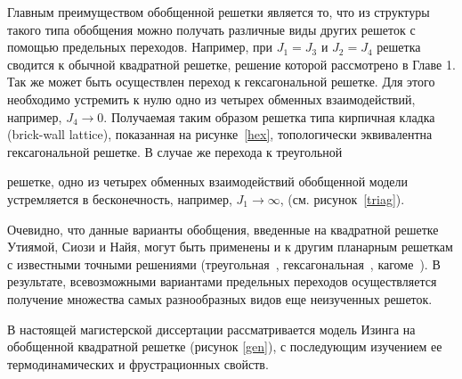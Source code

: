 Главным преимуществом обобщенной решетки является то, что из структуры такого типа обобщения можно получать различные виды других решеток с помощью предельных переходов. Например, при $J_1 = J_3$ и $J_2 = J_4$ решетка сводится к обычной квадратной решетке, решение которой рассмотрено в Главе 1. Так же может быть осуществлен переход к гексагональной решетке. Для этого необходимо устремить к нулю одно из четырех обменных взаимодействий, например, $J_4 \rightarrow 0$. Получаемая таким образом решетка типа \guillemotleft кирпичная кладка\guillemotright$ $ (brick-wall lattice), показанная на рисунке~\ref{hex}, топологически эквивалентна гексагональной решетке. В случае же перехода к треугольной 


\noindent решетке, одно из четырех обменных взаимодействий обобщенной модели устремляется в бесконечность, например, $J_1 \rightarrow \infty$, (см. рисунок~\ref{triag}).

Очевидно, что данные варианты обобщения, введенные на квадратной решетке Утиямой, Сиози и Найя, могут быть применены и к другим планарным решеткам с известными точными решениями (треугольная~\cite{wannier1950}, гексагональная~\cite{houtapell1950}, кагоме~\cite{kano_naya1953}). В результате, всевозможными вариантами предельных переходов осуществляется получение множества самых разнообразных видов еще неизученных решеток.



В настоящей магистерской диссертации рассматривается модель Изинга на обобщенной квадратной решетке (рисунок \ref{gen}), с последующим изучением ее термодинамических и фрустрационных свойств. 



